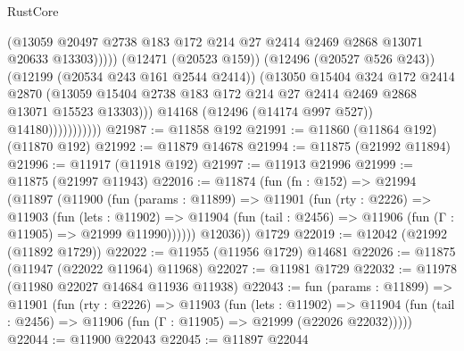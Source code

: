 \begin{lexlean}{RustCore}
\begin{coremodule}
                                    (@13059
                                      @20497
                                      @2738
                                      @183
                                      @172
                                      @214
                                      @27
                                      @2414
                                      @2469
                                      @2868
                                      @13071
                                      @20633
                                      @13303)))))
                            (@12471 (@20523 @159))
                            (@12496 (@20527 @526 @243))
                            (@12199 (@20534 @243 @161 @2544 @2414))
                            (@13050
                              @15404
                              @324
                              @172
                              @2414
                              @2870
                              (@13059
                                @15404
                                @2738
                                @183
                                @172
                                @214
                                @27
                                @2414
                                @2469
                                @2868
                                @13071
                                @15523
                                @13303)))
                          @14168
                          (@12496 (@14174 @997 @527))
                          @14180)))))))))))
@21987 := @11858 @192
@21991 := @11860 (@11864 @192) (@11870 @192)
@21992 := @11879 @14678
@21994 := @11875 (@21992 @11894)
@21996 := @11917 (@11918 @192)
@21997 := @11913 @21996
@21999 := @11875 (@21997 @11943)
@22016 := @11874
    (fun (fn : @152) =>
    @21994
      (@11897
        (@11900
          (fun (params : @11899) =>
          @11901
            (fun (rty : @2226) =>
            @11903
              (fun (lets : @11902) =>
              @11904 (fun (tail : @2456) => @11906 (fun (Γ : @11905) => @21999 @11990))))))
        @12036))
    @1729
@22019 := @12042 (@21992 (@11892 @1729))
@22022 := @11955 (@11956 @1729) @14681
@22026 := @11875 (@11947 (@22022 @11964) @11968)
@22027 := @11981 @1729
@22032 := @11978 (@11980 @22027 @14684 @11936 @11938)
@22043 := fun (params : @11899) =>
  @11901
    (fun (rty : @2226) =>
    @11903
      (fun (lets : @11902) =>
      @11904 (fun (tail : @2456) => @11906 (fun (Γ : @11905) => @21999 (@22026 @22032)))))
@22044 := @11900 @22043
@22045 := @11897 @22044

\end{coremodule}
\end{lexlean}
